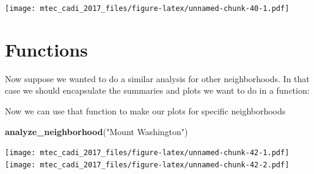 \documentclass[12pt,]{book}
\newenvironment{Shaded}{\begin{snugshade}}{\end{snugshade}}
\newcommand{\KeywordTok}[1]{\textcolor[rgb]{0.13,0.29,0.53}{\textbf{#1}}}
\newcommand{\DataTypeTok}[1]{\textcolor[rgb]{0.13,0.29,0.53}{#1}}
\newcommand{\StringTok}[1]{\textcolor[rgb]{0.31,0.60,0.02}{#1}}
\newcommand{\ControlFlowTok}[1]{\textcolor[rgb]{0.13,0.29,0.53}{\textbf{#1}}}
\newcommand{\OperatorTok}[1]{\textcolor[rgb]{0.81,0.36,0.00}{\textbf{#1}}}
\newcommand{\NormalTok}[1]{#1}
\theoremstyle{definition}
\theoremstyle{definition}
\theoremstyle{remark}
\begin{document}
\texttt{[image: mtec\_cadi\_2017\_files/figure-latex/unnamed-chunk-40-1.pdf]}

\section{Functions}\label{functions}

Now suppose we wanted to do a similar analysis for other neighborhoods.
In that case we should encapsulate the summaries and plots we want to do
in a function:

\begin{Shaded}
\end{Shaded}

Now we can use that function to make our plots for specific
neighborhoods

\begin{Shaded}
\begin{Highlighting}[]
\KeywordTok{analyze_neighborhood}\NormalTok{(}\StringTok{"Mount Washington"}\NormalTok{)}
\end{Highlighting}
\end{Shaded}

\texttt{[image: mtec\_cadi\_2017\_files/figure-latex/unnamed-chunk-42-1.pdf]}
\texttt{[image: mtec\_cadi\_2017\_files/figure-latex/unnamed-chunk-42-2.pdf]}
\end{document}

